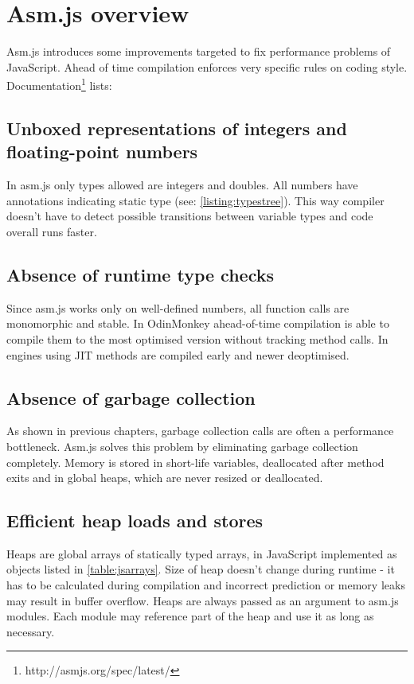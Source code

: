 \section{Asm.js overview}
\label{sec:asmjsoverview}

Asm.js introduces some improvements targeted to fix performance problems of JavaScript. Ahead of time compilation enforces very specific rules on coding style. Documentation\footnote{http://asmjs.org/spec/latest/} lists:

\subsection{Unboxed representations of integers and floating-point numbers}
\label{sec:asmjsunboxed}
In asm.js only types allowed are integers and doubles. All numbers have annotations indicating static type (see: \ref{listing:typestree}). This way compiler doesn't have to detect possible transitions between variable types and code overall runs faster.

\subsection{Absence of runtime type checks}
\label{sec:asmjstypechecks}
Since asm.js works only on well-defined numbers, all function calls are monomorphic and stable. In OdinMonkey ahead-of-time compilation is able to compile them to the most optimised version without tracking method calls. In engines using JIT methods are compiled early and newer deoptimised.

\subsection{Absence of garbage collection}
\label{sec:asmjsgc}
As shown in previous chapters, garbage collection calls are often a performance bottleneck. Asm.js solves this problem by eliminating garbage collection completely. Memory is stored in short-life variables, deallocated after method exits and in global heaps, which are never resized or deallocated.

\subsection{Efficient heap loads and stores}
\label{sec:asmjsheap}

Heaps are global arrays of statically typed arrays, in JavaScript implemented as objects listed in \ref{table:jsarrays}. Size of heap doesn't change during runtime - it has to be calculated during compilation and incorrect prediction or memory leaks may result in buffer overflow. Heaps are always passed as an argument to asm.js modules. Each module may reference part of the heap and use it as long as necessary.


